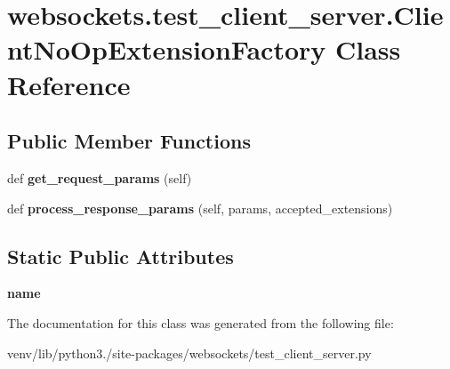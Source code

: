 \hypertarget{classwebsockets_1_1test__client__server_1_1_client_no_op_extension_factory}{}\section{websockets.\+test\+\_\+client\+\_\+server.\+Client\+No\+Op\+Extension\+Factory Class Reference}
\label{classwebsockets_1_1test__client__server_1_1_client_no_op_extension_factory}
\subsection*{Public Member Functions}
\begin{DoxyCompactItemize}
\item 
\mbox{\label{classwebsockets_1_1test__client__server_1_1_client_no_op_extension_factory_a5b51fdf2e269873b56229a16053b66ff}} 
def {\bfseries get\+\_\+request\+\_\+params} (self)
\item 
\mbox{\label{classwebsockets_1_1test__client__server_1_1_client_no_op_extension_factory_ae01df267dda5e07e414c1132cde0e9ab}} 
def {\bfseries process\+\_\+response\+\_\+params} (self, params, accepted\+\_\+extensions)
\end{DoxyCompactItemize}
\subsection*{Static Public Attributes}
\begin{DoxyCompactItemize}
\item 
\mbox{\label{classwebsockets_1_1test__client__server_1_1_client_no_op_extension_factory_a69f49d5f990552d4c54213ff91ee6280}} 
{\bfseries name}
\end{DoxyCompactItemize}


The documentation for this class was generated from the following file\+:\begin{DoxyCompactItemize}
\item 
venv/lib/python3./site-\/packages/websockets/test\+\_\+client\+\_\+server.\+py\end{DoxyCompactItemize}
